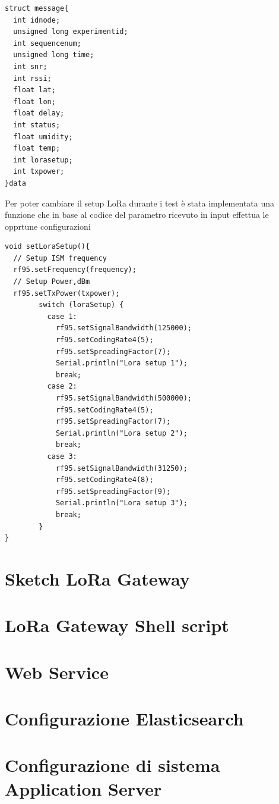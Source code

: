 \documentclass[12pt,a4paper,openright,twoside]{report}
\begin{document}
\begin{lstlisting}
struct message{
  int idnode;
  unsigned long experimentid;
  int sequencenum;
  unsigned long time;
  int snr;
  int rssi;
  float lat;
  float lon;
  float delay;
  int status;
  float umidity;
  float temp;
  int lorasetup;
  int txpower;
}data
\end{lstlisting}
Per poter cambiare il setup LoRa durante i test \`e stata implementata una funzione che in base al codice del parametro ricevuto in input effettua le opprtune configurazioni 

\begin{lstlisting}
void setLoraSetup(){
  // Setup ISM frequency
  rf95.setFrequency(frequency);
  // Setup Power,dBm
  rf95.setTxPower(txpower);
        switch (loraSetup) {
          case 1:
            rf95.setSignalBandwidth(125000);
            rf95.setCodingRate4(5);
            rf95.setSpreadingFactor(7);
            Serial.println("Lora setup 1");
            break;
          case 2:
            rf95.setSignalBandwidth(500000);
            rf95.setCodingRate4(5);
            rf95.setSpreadingFactor(7);
            Serial.println("Lora setup 2");
            break;
          case 3:
            rf95.setSignalBandwidth(31250);
            rf95.setCodingRate4(8);
            rf95.setSpreadingFactor(9);
            Serial.println("Lora setup 3");
            break;
        }
}
\end{lstlisting}


\section{Sketch LoRa Gateway}

\section{LoRa Gateway Shell script}

\section{Web Service}

\section{Configurazione Elasticsearch}

\section{Configurazione di sistema Application Server}
\end{document}
